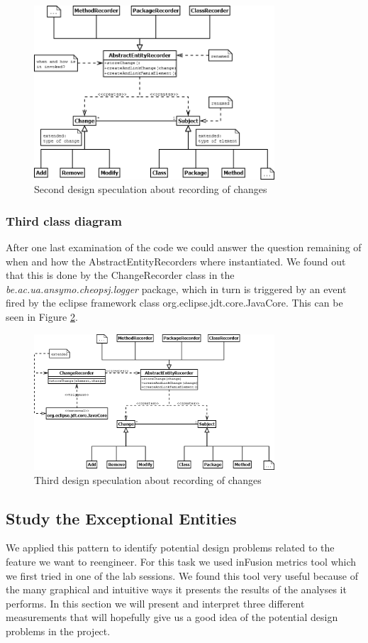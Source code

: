 \documentclass{article}
\begin{document}
\begin{figure}[h]
\centering
\includegraphics[width=0.8\textwidth]{Images/spec1}
\caption{Second design speculation about recording of changes}
\label{fig:spec1}
\end{figure}

\subsubsection{Third class diagram}
After one last examination of the code we could answer the question remaining of when and how the AbstractEntityRecorders where instantiated. We found out that this is done by the ChangeRecorder class in the \emph{be.ac.ua.ansymo.cheopsj.logger} package, which in turn is triggered by an event fired by the eclipse framework class org.eclipse.jdt.core.JavaCore. This can be seen in Figure \ref{fig:spec2b}.

\begin{figure}[h]
\centering
\includegraphics[width=0.8\textwidth]{Images/spec2b}
\caption{Third design speculation about recording of changes}
\label{fig:spec2b}
\end{figure}

\subsection{Study the Exceptional Entities}
We applied this pattern to identify potential design problems related to the feature we want to reengineer. For this task we used inFusion metrics tool which we first tried in one of the lab sessions. We found this tool very useful because of the many graphical and intuitive ways it presents the results of the analyses it performs. In this section we will present and interpret three different measurements that will hopefully give us a good idea of the potential design problems in the project. 
\end{document}
